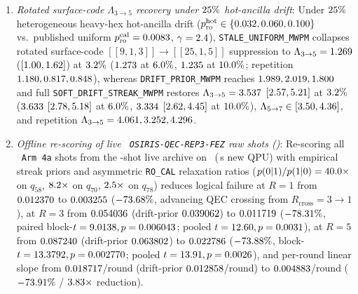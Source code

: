 \documentclass[aps,prx,twocolumn,superscriptaddress,nofootinbib]{revtex4-2}
\begin{document}
\begin{enumerate}
  \item \emph{Rotated surface-code $\Lambda_{3\to 5}$ recovery under $25\%$ hot-ancilla drift}: Under $25\%$ heterogeneous heavy-hex hot-ancilla drift ($p_{\mathrm{ro}}^{\mathrm{hot}} \in \{0.032, 0.060, 0.100\}$ vs.\ published uniform $p_{\mathrm{ro}}^{\mathrm{cal}} = 0.0083$, $\gamma = 2.4$), \texttt{STALE\_UNIFORM\_MWPM} collapses rotated surface-code $[[9,1,3]] \to [[25,1,5]]$ suppression to $\Lambda_{3\to 5} = 1.269$ ($[1.00, 1.62]$) at $3.2\%$ ($1.273$ at $6.0\%$, $1.235$ at $10.0\%$; repetition $1.180, 0.817, 0.848$), whereas \texttt{DRIFT\_PRIOR\_MWPM} reaches $1.989, 2.019, 1.800$ and full \texttt{SOFT\_DRIFT\_STREAK\_MWPM} restores $\Lambda_{3\to 5} = 3.537$ $[2.57, 5.21]$ at $3.2\%$ ($3.633$ $[2.78, 5.18]$ at $6.0\%$, $3.334$ $[2.62, 4.45]$ at $10.0\%$), $\Lambda_{5\to 7} \in [3.50, 4.36]$, and repetition $\Lambda_{3\to 5} = 4.061, 3.252, 4.296$.
  \item \emph{Offline re-scoring of live \rfsBackend\ \texttt{OSIRIS-QEC-REP3-FEZ} raw shots (\rfsSoftFezRepThreeJobId)}: Re-scoring all \rfsSoftFezArmFourShots\ \texttt{Arm 4a} shots from the \rfsSoftFezTotalShots-shot live archive on \rfsSoftFezChain\ (\rfsSimQpuSec\,s new QPU) with empirical streak priors and asymmetric \texttt{RO\_CAL} relaxation ratios ($p(0|1)/p(1|0) = 40.0\times$ on $q_{58}$, $8.2\times$ on $q_{70}$, $2.5\times$ on $q_{78}$) reduces logical failure at $R=1$ from $0.012370$ to $0.003255$ ($-73.68\%$, advancing QEC crossing from $R_{\mathrm{cross}} = 3 \to 1$), at $R=3$ from $0.054036$ (drift-prior $0.039062$) to $0.011719$ ($-78.31\%$, paired block-$t=9.0138, p=0.006043$; pooled $t=12.60, p=0.0031$), at $R=5$ from $0.087240$ (drift-prior $0.063802$) to $0.022786$ ($-73.88\%$, block-$t=13.3792, p=0.002770$; pooled $t=13.91, p=0.0026$), and per-round linear slope from $0.018717$/round (drift-prior $0.012858$/round) to $0.004883$/round ($-73.91\%$ / $3.83\times$ reduction).
\end{enumerate}
\end{document}
